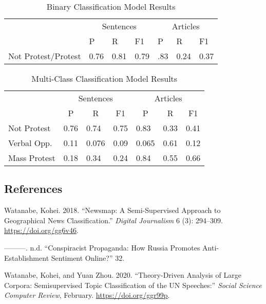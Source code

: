 \documentclass[
]{article}
\newlength{\cslhangindent}
\newlength{\cslentryspacingunit} %
\newenvironment{CSLReferences}[2] %
 {%
  \setlength{\parindent}{0pt}
  \ifodd #1
  \let\oldpar\par
  \def\par{\hangindent=\cslhangindent\oldpar}
  \fi
  \setlength{\parskip}{#2\cslentryspacingunit}
 }%
 {}
\begin{document}
\begin{table}[!htb]
\centering
\caption{Binary Classification Model Results}
\begin{tabular}{l|lll|lll}
\hline
 & \multicolumn{3}{c|}{Sentences} & \multicolumn{3}{c}{Articles} \\ \cline{2-7}
 & \multicolumn{1}{l|}{P} & \multicolumn{1}{l|}{R} & F1 & \multicolumn{1}{l|}{P} & \multicolumn{1}{l|}{R} & F1 \\ \cline{2-7} 
Not Protest/Protest & \multicolumn{1}{l|}{0.76} & \multicolumn{1}{l|}{0.81} & 0.79 & \multicolumn{1}{l|}{.83} & \multicolumn{1}{l|}{0.24} & 0.37 \\ \hline
\end{tabular}
\end{table}

\begin{table}[!htb]
\centering
\caption{Multi-Class Classification Model Results}
\begin{tabular}{l|lll|lll}
\hline
 & \multicolumn{3}{c|}{Sentences} & \multicolumn{3}{c}{Articles} \\ \cline{2-7} 
 & \multicolumn{1}{c|}{P} & \multicolumn{1}{c|}{R} & \multicolumn{1}{c|}{F1} & \multicolumn{1}{c|}{P} & \multicolumn{1}{c|}{R} & \multicolumn{1}{c}{F1} \\ \cline{2-7} 
Not Protest & \multicolumn{1}{l|}{0.76} & \multicolumn{1}{l|}{0.74} & 0.75 & \multicolumn{1}{l|}{0.83} & \multicolumn{1}{l|}{0.33} & 0.41 \\
Verbal Opp. & \multicolumn{1}{l|}{0.11} & \multicolumn{1}{l|}{0.076} & 0.09 & \multicolumn{1}{l|}{0.065} & \multicolumn{1}{l|}{0.61} & 0.12 \\
Mass Protest & \multicolumn{1}{l|}{0.18} & \multicolumn{1}{l|}{0.34} & 0.24 & \multicolumn{1}{l|}{0.84} & \multicolumn{1}{l|}{0.55} & 0.66 \\ \hline
\end{tabular}
\end{table}

\hypertarget{references}{%
\subsection*{References}\label{references}}

\hypertarget{refs}{}
\begin{CSLReferences}{1}{0}
\leavevmode{}%
Watanabe, Kohei. 2018. {``Newsmap: {A} Semi-Supervised Approach to
Geographical News Classification.''} \emph{Digital Journalism} 6 (3):
294--309. \url{https://doi.org/gg6v46}.

\leavevmode{}%
---------. n.d. {``Conspiracist Propaganda: {How Russia} Promotes
Anti-Establishment Sentiment Online?''} 32.

\leavevmode{}%
Watanabe, Kohei, and Yuan Zhou. 2020. {``Theory-{Driven Analysis} of
{Large Corpora}: {Semisupervised Topic Classification} of the {UN
Speeches}:''} \emph{Social Science Computer Review}, February.
\url{https://doi.org/ggr99p}.

\end{CSLReferences}
\end{document}
